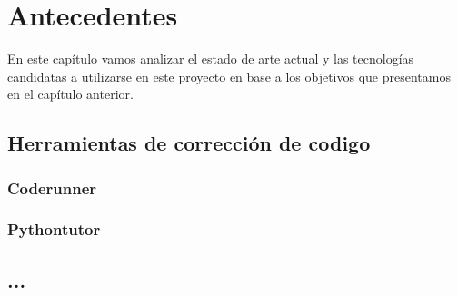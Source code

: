 \chapter{Antecedentes}

En este capítulo vamos analizar el estado de arte actual y las tecnologías candidatas a utilizarse en este proyecto en base a los objetivos que presentamos en el capítulo anterior.

\section {Herramientas de corrección de codigo}

\subsection {Coderunner}

\blindtext

\subsection {Pythontutor}

\blindtext

\section {...}

\blindtext



